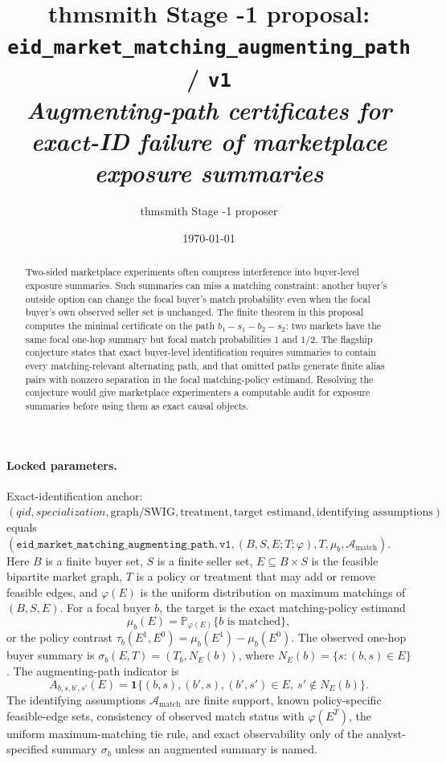 \documentclass[11pt]{article}
\title{thmsmith Stage -1 proposal: \texttt{eid\_market\_matching\_augmenting\_path} / \texttt{v1}%
  \\ \large\textit{Augmenting-path certificates for exact-ID failure of marketplace exposure summaries}}
\author{thmsmith Stage -1 proposer}
\date{\today}
\renewcommand{\Pr}{\mathbb{P}}
\newcommand{\one}{\mathbf{1}}
\theoremstyle{definition}
\theoremstyle{plain}
\theoremstyle{remark}
\begin{document}
\maketitle


\paragraph{Locked parameters.}
Exact-identification anchor:
$(qid,specialization,\text{graph/SWIG},\text{treatment},\text{target estimand},\text{identifying assumptions})$ equals
$(\texttt{eid\_market\_matching\_augmenting\_path},\texttt{v1},(B,S,E;T;\varphi),T,\mu_b,\mathcal A_{\mathrm{match}})$.
Here $B$ is a finite buyer set, $S$ is a finite seller set, $E\subseteq B\times S$ is the feasible bipartite market graph, $T$ is a policy or treatment that may add or remove feasible edges, and $\varphi(E)$ is the uniform distribution on maximum matchings of $(B,S,E)$.
For a focal buyer $b$, the target is the exact matching-policy estimand
\[
  \mu_b(E)=\Pr_{\varphi(E)}\{b\text{ is matched}\},
\]
or the policy contrast $\tau_b(E^1,E^0)=\mu_b(E^1)-\mu_b(E^0)$.
The observed one-hop buyer summary is $\sigma_b(E,T)=(T_b,N_E(b))$, where $N_E(b)=\{s:(b,s)\in E\}$.
The augmenting-path indicator is
\[
  A_{b,s,b',s'}(E)=\one\{(b,s),(b',s),(b',s')\in E,\ s'\notin N_E(b)\}.
\]
The identifying assumptions $\mathcal A_{\mathrm{match}}$ are finite support, known policy-specific feasible-edge sets, consistency of observed match status with $\varphi(E^T)$, the uniform maximum-matching tie rule, and exact observability only of the analyst-specified summary $\sigma_b$ unless an augmented summary is named.

\begin{abstract}
Two-sided marketplace experiments often compress interference into buyer-level exposure summaries. Such summaries can miss a matching constraint: another buyer's outside option can change the focal buyer's match probability even when the focal buyer's own observed seller set is unchanged. The finite theorem in this proposal computes the minimal certificate on the path $b_1-s_1-b_2-s_2$: two markets have the same focal one-hop summary but focal match probabilities $1$ and $1/2$. The flagship conjecture states that exact buyer-level identification requires summaries to contain every matching-relevant alternating path, and that omitted paths generate finite alias pairs with nonzero separation in the focal matching-policy estimand. Resolving the conjecture would give marketplace experimenters a computable audit for exposure summaries before using them as exact causal objects.
\end{abstract}
\end{document}
